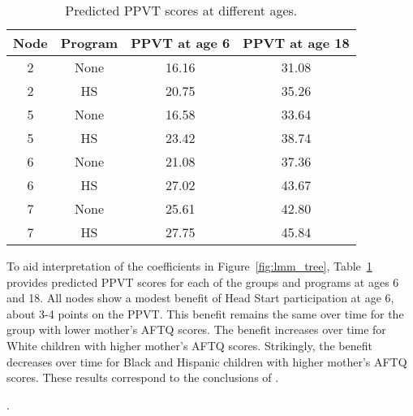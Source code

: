 \documentclass[doc,floatsintext,natbib]{apa7}
\newcommand{\edc}[1]{\textcolor{blue}{#1}}
\begin{document}
\begin{table}

\caption{\label{tab:predictions}Predicted PPVT scores at different ages.}
\begin{tabular}[t]{cccc}
\toprule
Node & Program & PPVT at age 6 & PPVT at age 18\\
\midrule
2 & None & 16.16 & 31.08\\
2 & HS & 20.75 & 35.26\\
5 & None & 16.58 & 33.64\\
5 & HS & 23.42 & 38.74\\
6 & None & 21.08 & 37.36\\
6 & HS & 27.02 & 43.67\\
7 & None & 25.61 & 42.80\\
7 & HS & 27.75 & 45.84\\
\bottomrule
\end{tabular}
\end{table}
To aid interpretation of the coefficients in Figure~\ref{fig:lmm_tree}, Table~\ref{tab:predictions} provides predicted PPVT scores for each of the groups and programs at ages 6 and 18. All nodes show a modest benefit of Head Start participation at age 6, about 3-4 points on the PPVT. This benefit remains the same over time for the group with lower mother's AFTQ scores. The benefit increases over time for White children with higher mother's AFTQ scores. Strikingly, the benefit decreases over time for Black and Hispanic children with higher mother's AFTQ scores. These results correspond to the conclusions of \cite{Demi09}. 


.


\end{document}
